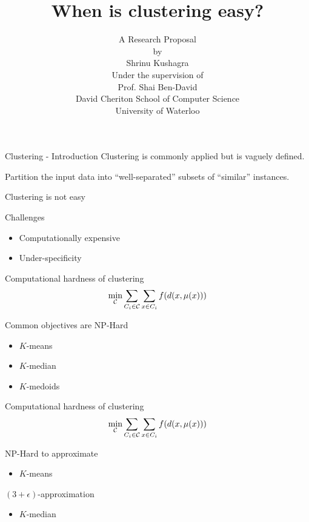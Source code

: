 \documentclass{beamer}
\title[Easy clustering]{When is clustering easy? }
\author[Kushagra, Shrinu]{
A Research Proposal\\
by\\
Shrinu Kushagra\\
\vspace{20pt}Under the supervision of\\
Prof. Shai Ben-David\vspace{20pt}\\
David Cheriton School of Computer Science\\
University of Waterloo
}
\newcommand{\mc}{\mathcal}
\begin{document}
\begin{frame}
  \titlepage
\end{frame}

\begin{frame}{Clustering - Introduction}
  Clustering is commonly applied but is vaguely defined.

	\vspace{2cm}

	Partition the input data into \alert{``well-separated''} subsets of \alert{``similar''} instances.
\end{frame}

\begin{frame}{Clustering is not easy}

  {\color{red}Challenges }
  \vspace{0.4cm}
  \begin{itemize}
    \item Computationally expensive
    \vspace{1.5cm}
	\item Under-specificity
  \end{itemize}
\end{frame}

\begin{frame}{Computational hardness of clustering}
	$$\min_{\mc C} \sum_{C_i \in \mc C} \sum_{x \in C_i} f(d(x, \mu(x)))\vspace{0.5cm}$$
	
	Common objectives are NP-Hard
	\begin{itemize}
	  \vspace{0.3cm}\item $K$-means 	  
	  \vspace{0.3cm}\item $K$-median
	  \vspace{0.3cm}\item $K$-medoids
	\end{itemize}
\end{frame}

\begin{frame}{Computational hardness of clustering}
	$$\min_{\mc C} \sum_{C_i \in \mc C} \sum_{x \in C_i} f(d(x, \mu(x)))\vspace{0.5cm}$$
	
	NP-Hard to approximate
	\begin{itemize}
	  \vspace{0.3cm}\item $K$-means 	  
	\end{itemize}  
	\vspace{0.5cm}$(3+\epsilon)$-approximation
	\begin{itemize}
	  \vspace{0.3cm}\item $K$-median
    \end{itemize}
\end{frame}
\end{document}

